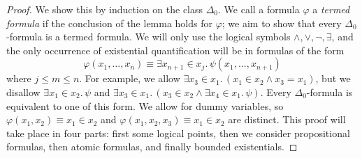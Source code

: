 \begin{proof}
    We show this by induction on the class \( \Delta_0 \).
    We call a formula \( \varphi \) a \emph{termed formula} if the conclusion of the lemma holds for \( \varphi \); we aim to show that every \( \Delta_0 \)-formula is a termed formula.
    We will only use the logical symbols \( \wedge, \vee, \neg, \exists \), and the only occurrence of existential quantification will be in formulas of the form
    \[ \varphi(x_1, \dots, x_n) \equiv \exists x_{n+1} \in x_j.\, \psi(x_1, \dots, x_{n+1}) \]
    where \( j \leq m \leq n \).
    For example, we allow \( \exists x_3 \in x_1.\, (x_1 \in x_2 \wedge x_3 = x_1) \), but we disallow \( \exists x_1 \in x_2.\, \psi \) and \( \exists x_3 \in x_1.\, (x_3 \in x_2 \wedge \exists x_4 \in x_1.\, \psi) \).
    Every \( \Delta_0 \)-formula is equivalent to one of this form.
    We allow for dummy variables, so \( \varphi(x_1, x_2) \equiv x_1 \in x_2 \) and \( \varphi(x_1, x_2, x_3) \equiv x_1 \in x_2 \) are distinct.
    This proof will take place in four parts: first some logical points, then we consider propositional formulas, then atomic formulas, and finally bounded existentials.


\end{proof}
